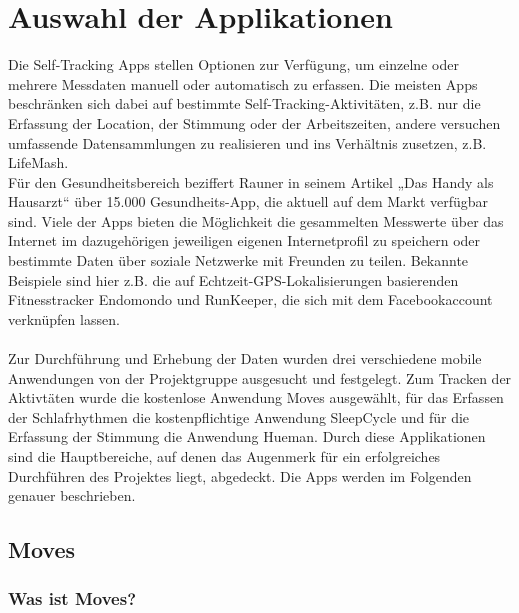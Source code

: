 
\chapter{Auswahl der Applikationen}
\label{ch:Apps}

Die Self-Tracking Apps stellen Optionen zur Verfügung, um einzelne oder mehrere Messdaten manuell oder automatisch zu erfassen. 
Die meisten Apps beschränken sich dabei auf bestimmte Self-Tracking-Aktivitäten, z.B. nur die Erfassung der Location, der Stimmung oder der Arbeitszeiten, andere versuchen umfassende Datensammlungen zu realisieren und ins Verhältnis zusetzen, z.B. LifeMash.
\\
Für den Gesundheitsbereich beziffert Rauner in seinem Artikel „Das Handy als Hausarzt“ über 15.000 Gesundheits-App, die aktuell auf dem Markt verfügbar sind. 
Viele der Apps bieten die Möglichkeit die gesammelten Messwerte über das Internet im dazugehörigen jeweiligen eigenen Internetprofil zu speichern oder bestimmte Daten über soziale Netzwerke mit Freunden zu teilen. 
Bekannte Beispiele sind hier z.B. die auf Echtzeit-GPS-Lokalisierungen basierenden Fitnesstracker Endomondo und RunKeeper, die sich mit dem Facebookaccount verknüpfen lassen. 
\\
\\
Zur Durchführung und Erhebung der Daten wurden drei verschiedene mobile Anwendungen von der Projektgruppe ausgesucht und festgelegt.
Zum Tracken der Aktivtäten wurde die kostenlose Anwendung Moves ausgewählt, für das Erfassen der Schlafrhythmen die kostenpflichtige Anwendung SleepCycle und für die Erfassung der Stimmung die Anwendung Hueman.
Durch diese Applikationen sind die Hauptbereiche, auf denen das Augenmerk für ein erfolgreiches Durchführen des Projektes liegt, abgedeckt.
Die Apps werden im Folgenden genauer beschrieben.


\section{Moves}
\label{ch:Apps:sec:Moves}

\subsection{Was ist Moves?}
\label{ch:Apps:sec:Moves:subsec:WIM}

